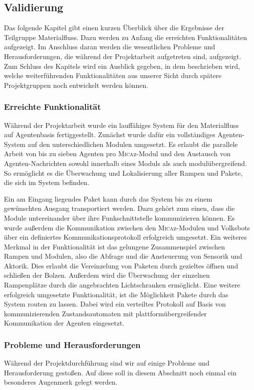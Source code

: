 \subsection{Validierung}
Das folgende Kapitel gibt einen kurzen Überblick über die Ergebnisse der Teilgruppe Materialfluss. Dazu werden zu Anfang die erreichten Funktionalitäten aufgezeigt. Im Anschluss daran werden die wesentlichen Probleme und Herausforderungen, die während der Projektarbeit aufgetreten sind, aufgezeigt. Zum Schluss des Kapitels wird ein Ausblick gegeben, in dem beschrieben wird, welche weiterführenden Funktionalitäten aus unserer Sicht durch spätere Projektgruppen noch entwickelt werden können.

\subsubsection{Erreichte Funktionalität}
Während der Projektarbeit wurde ein lauffähiges System für den Materialfluss auf Agentenbasis fertiggestellt. Zunächst wurde dafür ein vollständiges Agenten-System auf den unterschiedlichen Modulen umgesetzt. Es erlaubt die parallele Arbeit von bis zu sieben Agenten pro \textsc{Mica}z-Modul und den Austausch von Agenten-Nachrichten sowohl innerhalb eines Moduls als auch modulübergreifend. So ermöglicht es die Überwachung und Lokalisierung aller Rampen und Pakete, die sich im System befinden.

Ein am Eingang liegendes Paket kann durch das System bis zu einem gewünschten Ausgang transportiert werden. Dazu gehört zum einen, dass die Module untereinander über ihre Funkschnittstelle kommunizieren können. Es wurde außerdem die Kommunikation zwischen den \textsc{Mica}z-Modulen und Volksbots über ein definiertes Kommunikationsprotokoll erfolgreich umgesetzt. Ein weiteres Merkmal in der Funktionalität ist das gelungene Zusammenspiel zwischen Rampen und Modulen, also die Abfrage und die Ansteuerung von Sensorik und Aktorik. Dies erlaubt die Vereinzelung von Paketen durch gezieltes öffnen und schließen der Bolzen. Außerdem wird die Überwachung der einzelnen Rampenplätze durch die angebrachten Lichtschranken ermöglicht. Eine weitere erfolgreich umgesetzte Funktionalität, ist die Möglichkeit Pakete durch das System routen zu lassen. Dabei wird ein verteiltes Protokoll auf Basis von kommunizierenden Zustandsautomaten mit plattformübergreifender Kommunikation der Agenten eingesetzt. 

\subsubsection{Probleme und Herausforderungen}
Während der Projektdurchführung sind wir auf einige Probleme und Herausforderung gestoßen. Auf diese soll in diesem Abschnitt noch einmal ein besonderes Augenmerk gelegt werden. 

